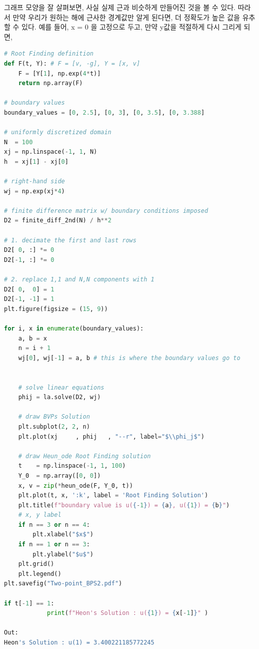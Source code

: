 \documentclass[11pt]{article}
\begin{document}
그래프 모양을 잘 살펴보면, 사실 실제 근과 비슷하게 만들어진 것을 볼 수 있다. 따라서 만약 우리가 원하는 해에 근사한 경계값만 알게 된다면, 더 정확도가 높은 값을 유추할 수 있다. 예를 들어, x = 0 을 고정으로 두고, 만약 y값을 적절하게 다시 그리게 되면,



\begin{lstlisting}[language=Python]
# Root Finding definition
def F(t, Y): # F = [v, -g], Y = [x, v]
    F = [Y[1], np.exp(4*t)]
    return np.array(F)

# boundary values
boundary_values = [0, 2.5], [0, 3], [0, 3.5], [0, 3.388]

# uniformly discretized domain
N  = 100
xj = np.linspace(-1, 1, N)
h  = xj[1] - xj[0]

# right-hand side
wj = np.exp(xj*4)

# finite difference matrix w/ boundary conditions imposed
D2 = finite_diff_2nd(N) / h**2

# 1. decimate the first and last rows
D2[ 0, :] *= 0
D2[-1, :] *= 0

# 2. replace 1,1 and N,N components with 1
D2[ 0,  0] = 1
D2[-1, -1] = 1
plt.figure(figsize = (15, 9))

for i, x in enumerate(boundary_values):
    a, b = x
    n = i + 1
    wj[0], wj[-1] = a, b # this is where the boundary values go to


    # solve linear equations
    phij = la.solve(D2, wj)

    # draw BVPs Solution
    plt.subplot(2, 2, n)
    plt.plot(xj     , phij   , "--r", label="$\\phi_j$")
    
    # draw Heun_ode Root Finding solution 
    t    = np.linspace(-1, 1, 100)
    Y_0  = np.array([0, 0])
    x, v = zip(*heun_ode(F, Y_0, t))
    plt.plot(t, x, ':k', label = 'Root Finding Solution')  
    plt.title(f"boundary value is u({-1}) = {a}, u({1}) = {b}")
    # x, y label
    if n == 3 or n == 4:
        plt.xlabel("$x$")
    if n == 1 or n == 3:
        plt.ylabel("$u$")
    plt.grid()
    plt.legend()
plt.savefig("Two-point_BPS2.pdf")

if t[-1] == 1:
            print(f"Heon's Solution : u({1}) = {x[-1]}" )
            
Out:
Heon's Solution : u(1) = 3.400221185772245

\end{lstlisting}
\end{document}
